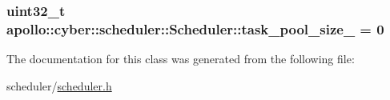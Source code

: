 \hypertarget{classapollo_1_1cyber_1_1scheduler_1_1Scheduler_a6bc9dcb1108028aca458f1a328484e82}{
\subsubsection[{task\-\_\-pool\-\_\-size\-\_\-}]{\setlength{\rightskip}{0pt plus 5cm}uint32\-\_\-t apollo\-::cyber\-::scheduler\-::\-Scheduler\-::task\-\_\-pool\-\_\-size\-\_\- = 0\hspace{0.3cm}{\ttfamily [protected]}}}\label{classapollo_1_1cyber_1_1scheduler_1_1Scheduler_a6bc9dcb1108028aca458f1a328484e82}


The documentation for this class was generated from the following file\-:\begin{DoxyCompactItemize}
\item 
scheduler/\hyperlink{scheduler_8h}{scheduler.\-h}\end{DoxyCompactItemize}
